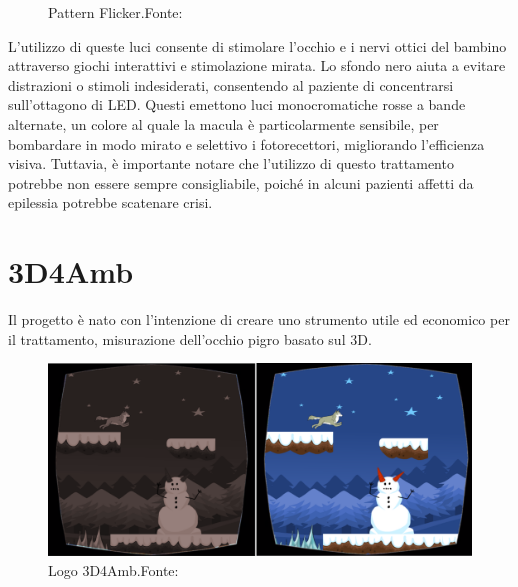 \documentclass[
a4paper,
cleardoublepage=empty,
headings=twolinechapter,
numbers=autoenddot,
]{scrbook}
\begin{document}
\begin{itemize}
\begin{figure}[H]
	    	\caption{Pattern Flicker.Fonte:\cite{Pattern-Flicker}}
	    	\label{fig:Pattern-Flicker}
	    \end{figure}
    L'utilizzo di queste luci consente di stimolare l'occhio e i nervi ottici del bambino attraverso giochi interattivi e stimolazione mirata. Lo sfondo nero aiuta a evitare distrazioni o stimoli indesiderati, consentendo al paziente di concentrarsi sull'ottagono di LED. Questi emettono luci monocromatiche rosse a bande alternate, un colore al quale la macula è particolarmente sensibile, per bombardare in modo mirato e selettivo i fotorecettori, migliorando l'efficienza visiva. Tuttavia, è importante notare che l'utilizzo di questo trattamento potrebbe non essere sempre consigliabile, poiché in alcuni pazienti affetti da epilessia potrebbe scatenare crisi.
    \end{itemize}

	\chapter{3D4Amb}
	Il progetto è nato con l'intenzione di creare uno strumento utile ed economico per il trattamento, misurazione dell'occhio pigro basato sul 3D.
	 \begin{figure}[h]
		\centering
		\includegraphics[width=0.8\linewidth]{image/3D4Amb}
		\caption{Logo 3D4Amb.Fonte:\cite{3d4amb}}
		\label{fig:3D4Amb}
	\end{figure}
\end{document}
